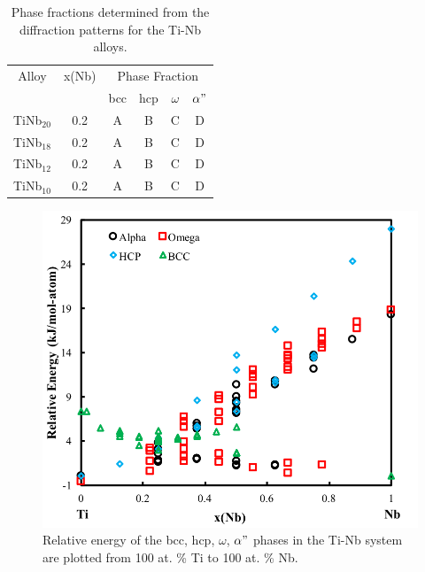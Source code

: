 \newpage
\begin{table}[H]
	\caption{Phase fractions determined from the diffraction patterns for the Ti-Nb alloys.}
	\centering
	\begin{tabular}{ c c c c c c }
		\hline
		Alloy & x(Nb) & \multicolumn{4}{c}{Phase Fraction} \\
		&  & bcc & hcp & $\omega$ & $\alpha"$ \\
		\hline
		TiNb$_{20}$ & 0.2 & A & B & C & D \\
		TiNb$_{18}$ & 0.2 & A & B & C & D \\
		TiNb$_{12}$ & 0.2 & A & B & C & D \\
		TiNb$_{10}$ & 0.2 & A & B & C & D \\
		\hline
	\end{tabular}
	\label{Ch7-table:phasefrac}
\end{table}
\clearpage

\pagebreak
\begin{figure}[H]
	\centering
	\includegraphics[width=\textwidth]{Chapter-7/Figures/tinb0k.png}
	\caption{Relative energy of the bcc, hcp, $\omega$, $\alpha"$ phases in the Ti-Nb system are plotted from 100 at. \% Ti to 100 at. \% Nb.}
	\label{Ch7-figure:tinb0K}
\end{figure}

